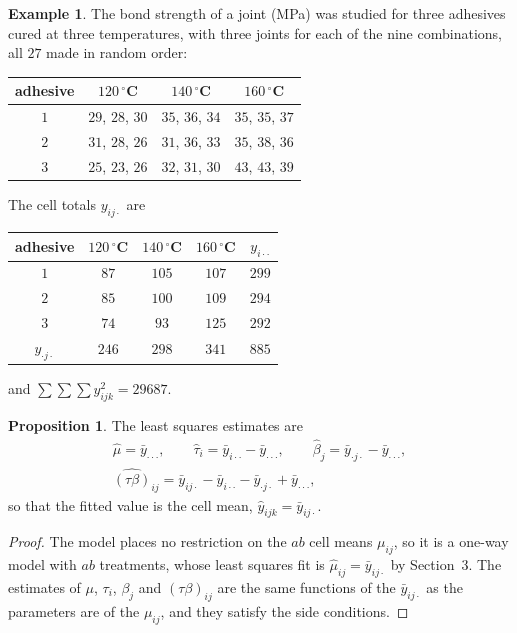 \documentclass[11pt,a4paper]{article}
\numberwithin{equation}{section}
\theoremstyle{definition}
\newtheorem{exa}[thm]{Example}
\newtheorem{prop}[thm]{Proposition}
\begin{document}
\begin{exa}\label{exa:adhesive}
The bond strength of a joint (MPa) was studied for three adhesives cured at three temperatures, with three joints for each of the nine
combinations, all $27$ made in random order:
\begin{center}
\begin{tabular}{c|ccc}
adhesive & $120\,^\circ$C & $140\,^\circ$C & $160\,^\circ$C \\
\hline
$1$ & $29$, $28$, $30$ & $35$, $36$, $34$ & $35$, $35$, $37$ \\
$2$ & $31$, $28$, $26$ & $31$, $36$, $33$ & $35$, $38$, $36$ \\
$3$ & $25$, $23$, $26$ & $32$, $31$, $30$ & $43$, $43$, $39$
\end{tabular}
\end{center}
The cell totals $y_{ij\cdot}$ are
\begin{center}
\begin{tabular}{c|ccc|c}
adhesive & $120\,^\circ$C & $140\,^\circ$C & $160\,^\circ$C & $y_{i\cdot\cdot}$ \\
\hline
$1$ & $87$ & $105$ & $107$ & $299$ \\
$2$ & $85$ & $100$ & $109$ & $294$ \\
$3$ & $74$ & $93$ & $125$ & $292$ \\
\hline
$y_{\cdot j\cdot}$ & $246$ & $298$ & $341$ & $885$
\end{tabular}
\end{center}
and $\sum\sum\sum y_{ijk}^2 = 29687$.
\end{exa}

\begin{prop}\label{prop:two-factor-est}
The least squares estimates are
\begin{gather*}
\hat\mu = \bar y_{\cdot\cdot\cdot} , \qquad \hat\tau_i = \bar y_{i\cdot\cdot} - \bar y_{\cdot\cdot\cdot} , \qquad \hat\beta_j = \bar y_{\cdot j\cdot} - \bar y_{\cdot\cdot\cdot} , \\
\widehat{(\tau\beta)}_{ij} = \bar y_{ij\cdot} - \bar y_{i\cdot\cdot} - \bar y_{\cdot j\cdot} + \bar y_{\cdot\cdot\cdot} ,
\end{gather*}
so that the fitted value is the cell mean, $\hat y_{ijk} = \bar y_{ij\cdot}$.
\end{prop}

\begin{proof}
The model places no restriction on the $ab$ cell means $\mu_{ij}$, so it is a one-way model with $ab$ treatments, whose least squares fit is $\hat\mu_{ij} = \bar y_{ij\cdot}$ by
Section~3. The estimates of $\mu$, $\tau_i$, $\beta_j$ and $(\tau\beta)_{ij}$ are the same functions of the $\bar y_{ij\cdot}$ as the parameters are of the $\mu_{ij}$, and they satisfy the side
conditions.
\end{proof}
\end{document}
